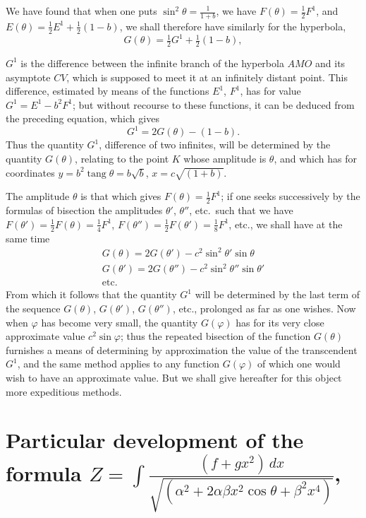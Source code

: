 \documentclass{article}
\begin{document}
We have found that when one puts $\sin^{2}\theta=\frac{1}{1+b}$, we have $F(\theta)=\frac{1}{2}F^{1}$, and $E(\theta)=\frac{1}{2}E^{1}+\frac{1}{2}(1-b)$, we shall therefore have similarly for the hyperbola,
\[ G(\theta)=\tfrac{1}{2}G^{1}+\tfrac{1}{2}(1-b), \]

$G^{1}$ is the difference between the infinite branch of the hyperbola $AMO$ and its asymptote $CV$, which is supposed to meet it at an infinitely distant point. This difference, estimated by means of the functions $E^{1}$, $F^{1}$, has for value $G^{1}=E^{1}-b^{2}F^{1}$; but without recourse to these functions, it can be deduced from the preceding equation, which gives
\[ G^{1}=2G(\theta)-(1-b). \]
Thus the quantity $G^{1}$, difference of two infinites, will be determined by the quantity $G(\theta)$, relating to the point $K$ whose amplitude is $\theta$, and which has for coordinates $y=b^{2}\operatorname{tang}\theta=b\sqrt{b}$, $x=c\sqrt{(1+b)}$.

The amplitude $\theta$ is that which gives $F(\theta)=\frac{1}{2}F^{1}$; if one seeks successively by the formulas of bisection the amplitudes $\theta'$, $\theta''$, etc.\ such that we have $F(\theta')=\frac{1}{2}F(\theta)=\frac{1}{4}F^{1}$, $F(\theta'')=\frac{1}{2}F(\theta')=\frac{1}{8}F^{1}$, etc., we shall have at the same time
\[ \begin{gathered} G(\theta)=2G(\theta')-c^{2}\sin^{2}\theta'\sin\theta\\ G(\theta')=2G(\theta'')-c^{2}\sin^{2}\theta''\sin\theta'\\ \text{etc.} \end{gathered} \]
From which it follows that the quantity $G^{1}$ will be determined by the last term of the sequence $G(\theta)$, $G(\theta')$, $G(\theta'')$, etc., prolonged as far as one wishes. Now when $\varphi$ has become very small, the quantity $G(\varphi)$ has for its very close approximate value $c^{2}\sin\varphi$; thus the repeated bisection of the function $G(\theta)$ furnishes a means of determining by approximation the value of the transcendent $G^{1}$, and the same method applies to any function $G(\varphi)$ of which one would wish to have an approximate value. But we shall give hereafter for this object more expeditious methods.

\section*{Particular development of the formula $Z=\displaystyle\int\frac{(f+gx^{2})\,dx}{\sqrt{(\alpha^{2}+2\alpha\beta x^{2}\cos\theta+\beta^{2}x^{4})}}$,}
\end{document}
